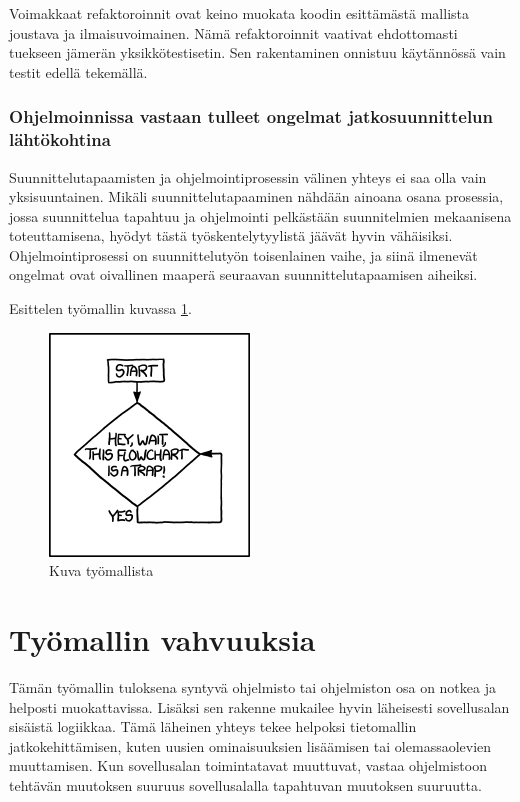 Voimakkaat refaktoroinnit ovat keino muokata koodin esittämästä mallista
joustava ja ilmaisuvoimainen. Nämä refaktoroinnit vaativat ehdottomasti
tuekseen jämerän yksikkötestisetin. Sen rakentaminen onnistuu
käytännössä vain testit edellä tekemällä.

\hypertarget{ohjelmoinnissa-vastaan-tulleet-ongelmat-jatkosuunnittelun-luxe4htuxf6kohtina}{%
\subsubsection{Ohjelmoinnissa vastaan tulleet ongelmat jatkosuunnittelun
lähtökohtina}\label{ohjelmoinnissa-vastaan-tulleet-ongelmat-jatkosuunnittelun-luxe4htuxf6kohtina}}

Suunnittelutapaamisten ja ohjelmointiprosessin välinen yhteys ei saa
olla vain yksisuuntainen. Mikäli suunnittelutapaaminen nähdään ainoana
osana prosessia, jossa suunnittelua tapahtuu ja ohjelmointi pelkästään
suunnitelmien mekaanisena toteuttamisena, hyödyt tästä
työskentelytyylistä jäävät hyvin vähäisiksi. Ohjelmointiprosessi on
suunnittelutyön toisenlainen vaihe, ja siinä ilmenevät ongelmat ovat
oivallinen maaperä seuraavan suunnittelutapaamisen aiheiksi.

Esittelen työmallin kuvassa \ref{tyomalli}.

\begin{figure}
\centering
\includegraphics{illustration/tyomalli.png}
\caption{\label{tyomalli} Kuva työmallista}
\end{figure}

\hypertarget{tyuxf6mallin-vahvuuksia}{%
\section{Työmallin vahvuuksia}\label{tyuxf6mallin-vahvuuksia}}

Tämän työmallin tuloksena syntyvä ohjelmisto tai ohjelmiston osa on
notkea ja helposti muokattavissa. Lisäksi sen rakenne mukailee hyvin
läheisesti sovellusalan sisäistä logiikkaa. Tämä läheinen yhteys tekee
helpoksi tietomallin jatkokehittämisen, kuten uusien ominaisuuksien
lisäämisen tai olemassaolevien muuttamisen. Kun sovellusalan
toimintatavat muuttuvat, vastaa ohjelmistoon tehtävän muutoksen suuruus
sovellusalalla tapahtuvan muutoksen suuruutta.

